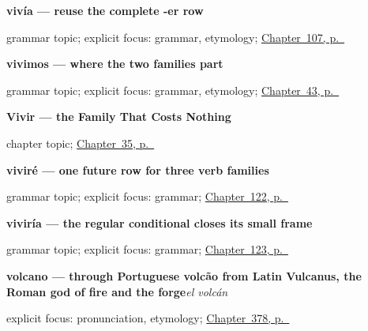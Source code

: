 \noindent\begin{minipage}[t]{\linewidth}
\raggedright
\textbf{vivía — reuse the complete -er row}\par
\footnotesize grammar topic; explicit focus: grammar, etymology; \hyperref[ch:spanish-imperfecto]{Chapter~107, p.~\pageref*{ch:spanish-imperfecto}}
\end{minipage}\par\smallskip

\noindent\begin{minipage}[t]{\linewidth}
\raggedright
\textbf{vivimos — where the two families part}\par
\footnotesize grammar topic; explicit focus: grammar, etymology; \hyperref[ch:spanish-er-ir-1pl]{Chapter~43, p.~\pageref*{ch:spanish-er-ir-1pl}}
\end{minipage}\par\smallskip

\noindent\begin{minipage}[t]{\linewidth}
\raggedright
\textbf{Vivir --- the Family That Costs Nothing}\par
\footnotesize chapter topic; \hyperref[ch:spanish-vivir]{Chapter~35, p.~\pageref*{ch:spanish-vivir}}
\end{minipage}\par\smallskip

\noindent\begin{minipage}[t]{\linewidth}
\raggedright
\textbf{viviré — one future row for three verb families}\par
\footnotesize grammar topic; explicit focus: grammar; \hyperref[ch:spanish-futuro]{Chapter~122, p.~\pageref*{ch:spanish-futuro}}
\end{minipage}\par\smallskip

\noindent\begin{minipage}[t]{\linewidth}
\raggedright
\textbf{viviría — the regular conditional closes its small frame}\par
\footnotesize grammar topic; explicit focus: grammar; \hyperref[ch:spanish-condicional]{Chapter~123, p.~\pageref*{ch:spanish-condicional}}
\end{minipage}\par\smallskip

\noindent\begin{minipage}[t]{\linewidth}
\raggedright
\textbf{volcano — through Portuguese volcão from Latin Vulcanus, the Roman god of fire and the forge}\enspace\emph{el volcán}\par
\footnotesize explicit focus: pronunciation, etymology; \hyperref[ch:la-selva-y-el-prado]{Chapter~378, p.~\pageref*{ch:la-selva-y-el-prado}}
\end{minipage}\par\smallskip


